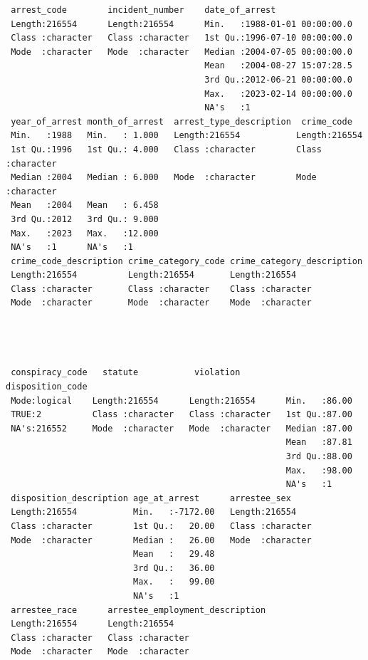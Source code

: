 \documentclass[
  article]{jss}
\begin{document}
\begin{verbatim}
 arrest_code        incident_number    date_of_arrest                 
 Length:216554      Length:216554      Min.   :1988-01-01 00:00:00.0  
 Class :character   Class :character   1st Qu.:1996-07-10 00:00:00.0  
 Mode  :character   Mode  :character   Median :2004-07-05 00:00:00.0  
                                       Mean   :2004-08-27 15:07:28.5  
                                       3rd Qu.:2012-06-21 00:00:00.0  
                                       Max.   :2023-02-14 00:00:00.0  
                                       NA's   :1                      
 year_of_arrest month_of_arrest  arrest_type_description  crime_code       
 Min.   :1988   Min.   : 1.000   Length:216554           Length:216554     
 1st Qu.:1996   1st Qu.: 4.000   Class :character        Class :character  
 Median :2004   Median : 6.000   Mode  :character        Mode  :character  
 Mean   :2004   Mean   : 6.458                                             
 3rd Qu.:2012   3rd Qu.: 9.000                                             
 Max.   :2023   Max.   :12.000                                             
 NA's   :1      NA's   :1                                                  
 crime_code_description crime_category_code crime_category_description
 Length:216554          Length:216554       Length:216554             
 Class :character       Class :character    Class :character          
 Mode  :character       Mode  :character    Mode  :character          
                                                                      
                                                                      
                                                                      
                                                                      
 conspiracy_code   statute           violation         disposition_code
 Mode:logical    Length:216554      Length:216554      Min.   :86.00   
 TRUE:2          Class :character   Class :character   1st Qu.:87.00   
 NA's:216552     Mode  :character   Mode  :character   Median :87.00   
                                                       Mean   :87.81   
                                                       3rd Qu.:88.00   
                                                       Max.   :98.00   
                                                       NA's   :1       
 disposition_description age_at_arrest      arrestee_sex      
 Length:216554           Min.   :-7172.00   Length:216554     
 Class :character        1st Qu.:   20.00   Class :character  
 Mode  :character        Median :   26.00   Mode  :character  
                         Mean   :   29.48                     
                         3rd Qu.:   36.00                     
                         Max.   :   99.00                     
                         NA's   :1                            
 arrestee_race      arrestee_employment_description
 Length:216554      Length:216554                  
 Class :character   Class :character               
 Mode  :character   Mode  :character               
                                                   

\end{verbatim}
\end{document}
